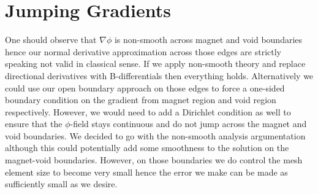 \documentclass[preprint,nocopyrightspace]{sigplanconf}
\begin{document}
\section{Jumping Gradients}
\label{sec:jumping-gradients}
One should observe that $\nabla \phi$ is non-smooth across magnet and
void boundaries hence our normal derivative approximation across those
edges are strictly speaking not valid in classical sense. If we apply
non-smooth theory and replace directional derivatives with
B-differentials then everything holds. Alternatively we could use our
open boundary approach on those edges to force a one-sided boundary
condition on the gradient from magnet region and void region
respectively. However, we would need to add a Dirichlet condition as
well to ensure that the $\phi$-field stays continuous and do not jump
across the magnet and void boundaries. We decided to go with the
non-smooth analysis argumentation although this could potentially add
some smoothness to the solution on the magnet-void
boundaries. However, on those boundaries we do control the mesh
element size to become very small hence the error we make can be made
as sufficiently small as we desire.



\end{document}
